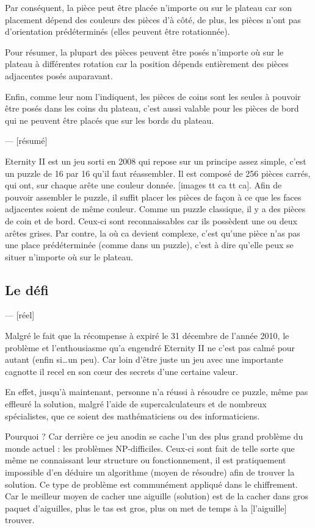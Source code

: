 	Par conséquent, la pièce peut être placée n'importe ou sur le plateau car son placement dépend des couleurs des pièces d'à côté, de plus, les pièces n'ont pas d'orientation prédéterminés (elles peuvent être rotationnée).
	
	Pour résumer, la plupart des pièces peuvent être posés n'importe où sur le plateau à différentes rotation car la position dépends entièrement des pièces adjacentes posés auparavant. 
	
	Enfin, comme leur nom l'indiquent, les pièces de coins sont les seules à pouvoir être posés dans les coins du plateau, c'est aussi valable pour les pièces de bord qui ne peuvent être placés que sur les bords du plateau.
	
	
	--- [résumé]
	
	Eternity II est un jeu sorti en 2008 qui repose sur un principe assez simple, c'est un puzzle de 16 par 16 qu'il faut réassembler. Il est composé de 256 pièces carrés, qui ont, sur chaque arête une couleur donnée. [images tt ca tt ca]. Afin de pouvoir assembler le puzzle, il suffit placer les pièces de façon à ce que les faces adjacentes soient de même couleur. Comme un puzzle classique, il y a des pièces de coin et de bord. Ceux-ci sont reconnaissables car ils possèdent une ou deux arêtes grises. Par contre, la où ca devient complexe, c'est qu'une pièce n'as pas une place prédéterminée (comme dans un puzzle), c'est à dire qu'elle peux se situer n'importe où sur le plateau. 
	
	\subsection{Le défi}
	--- [réel]
	
	Malgré le fait que la récompense à expiré le 31 décembre de l'année 2010, le problème et l'enthousiasme qu'a engendré Eternity II ne c'est pas calmé pour autant (enfin si\dots un peu). Car loin d'être juste un jeu avec une importante cagnotte il recel en son c\oe ur des secrets d'une certaine valeur.
	
	En effet, jusqu'à maintenant, personne n'a réussi à résoudre ce puzzle, même pas effleuré la solution, malgré l'aide de supercalculateurs et de nombreux spécialistes, que ce soient des mathématiciens ou des informaticiens.
	
	Pourquoi ? Car derrière ce jeu anodin se cache l'un des plus grand problème du monde actuel : les problèmes NP-difficiles. Ceux-ci sont fait de telle sorte que même ne connaissant leur structure ou fonctionnement, il est pratiquement impossible d'en déduire un algorithme (moyen de résoudre) afin de trouver la solution. Ce type de problème est communément appliqué dans le chiffrement. Car le meilleur moyen de cacher une aiguille (solution) est de la cacher dans gros paquet d'aiguilles, plus le tas est gros, plus on met de temps à la [l'aiguille] trouver.
	
